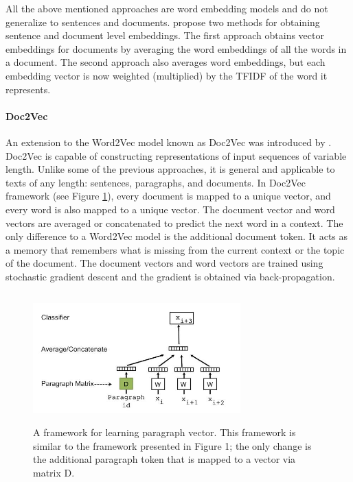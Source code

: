 All the above mentioned approaches are word embedding models and do not generalize to sentences and documents. \citet{jsnior2017nilc} propose two methods for obtaining sentence and document level embeddings. The first approach obtains vector embeddings for documents by averaging the word embeddings of all the words in a document. The second approach also averages word embeddings, but each embedding vector is now weighted (multiplied) by the TFIDF
of the word it represents.
\paragraph{Doc2Vec} An extension to the Word2Vec model known as Doc2Vec was introduced by \citet{le2014distributed}. Doc2Vec is capable of constructing representations of input sequences of
variable length. Unlike some of the previous approaches, it is general and
applicable to texts of any length: sentences, paragraphs, and documents. In
Doc2Vec framework (see Figure \ref{fig:doc2vec model}), every document is mapped to a unique
vector, and every word is also mapped to a unique vector. The document
vector and word vectors are averaged or concatenated to predict the next
word in a context. The only difference to a Word2Vec model is the additional
document token. It acts as a memory that remembers what is missing from
the current context or the topic of the document. The document vectors and
word vectors are trained using stochastic gradient descent and the gradient
is obtained via back-propagation.

\begin{figure}[h]
	\centering
	\includegraphics[width=8cm, height=5cm]{para}
	\caption[]{A framework for learning paragraph vector. This framework
		is similar to the framework presented in Figure 1; the only
		change is the additional paragraph token that is mapped to a vector
		via matrix D.}
	\label{fig:doc2vec model}
\end{figure}




	